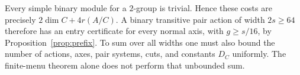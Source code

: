 Every simple binary module for a $2$-group is trivial. Hence these
costs are precisely $2\dim C+4r(A/C)$. A binary transitive pair
action of width $2s\geq64$ therefore has an entry certificate for
every normal axis, with $g\geq s/16$, by
Proposition~\ref{prop:prefix}. To sum over all widths one must also
bound the number of actions, axes, pair systems, cuts, and constants
$D_C$ uniformly. The finite-menu theorem alone does not perform that
unbounded sum.
